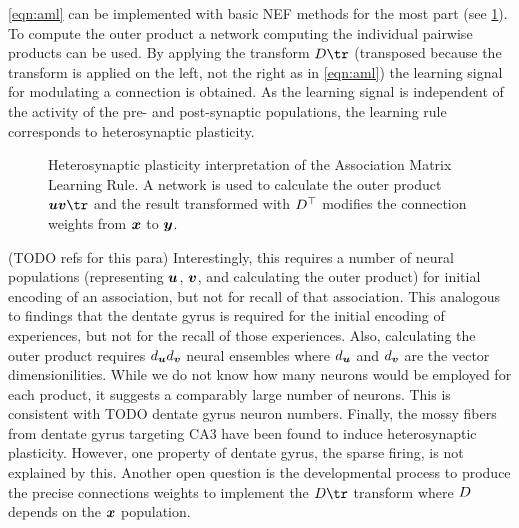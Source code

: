 \cref{eqn:aml} can be implemented with basic NEF methods for the most part (see \cref{fig:aml-heterosynaptic}).
To compute the outer product a network computing the individual pairwise products can be used.
By applying the transform $\mat D\tr$ (transposed because the transform is applied on the left, not the right as in \cref{eqn:aml}) the learning signal for modulating a connection is obtained.
As the learning signal is independent of the activity of the pre- and post-synaptic populations, the learning rule corresponds to heterosynaptic plasticity.
\begin{figure}
    \centering
    \caption{
        Heterosynaptic plasticity interpretation of the Association Matrix Learning Rule.
        A network is used to calculate the outer product $\vc u \vc v\tr$ and the result transformed with $D^{\top}$ modifies the connection weights from $\bm{x}$ to $\bm{y}$.
    }\label{fig:aml-heterosynaptic}
\end{figure}

(TODO refs for this para)
Interestingly, this requires a number of neural populations (representing $\bm{u}$, $\bm{v}$, and calculating the outer product) for initial encoding of an association, but not for recall of that association.
This analogous to findings that the dentate gyrus is required for the initial encoding of experiences, but not for the recall of those experiences.
Also, calculating the outer product requires $d_{\bm{u}} d_{\bm{v}}$ neural ensembles where $d_{\bm{u}}$ and $d_{\bm{v}}$ are the vector dimensionilities.
While we do not know how many neurons would be employed for each product, it suggests a comparably large number of neurons.
This is consistent with TODO dentate gyrus neuron numbers.
Finally, the mossy fibers from dentate gyrus targeting CA3 have been found to induce heterosynaptic plasticity.
However, one property of dentate gyrus, the sparse firing, is not explained by this.
Another open question is the developmental process to produce the precise connections weights to implement the $\mat D\tr$ transform where $D$ depends on the $\bm{x}$ population.

